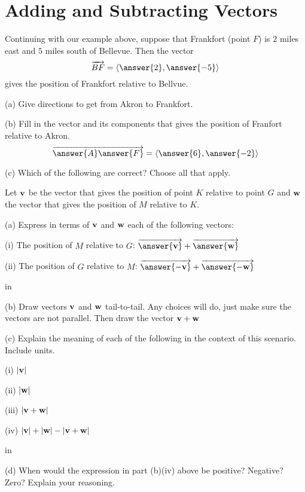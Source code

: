 \documentclass{ximera}
\newcommand{\pskip}{\vskip 0.1 in}
\begin{document}
\section{Adding and Subtracting Vectors}

\begin{question}    \label{Q234234:Vectors}
Continuing with our example above, suppose that Frankfort (point $F$) is $2$ miles east and $5$ miles south of Bellevue. Then the vector
\[
    \overrightarrow{BF}  = \langle \answer{2}, \answer{-5}\rangle
\]
gives the position of Frankfort relative to Bellvue. 
\end{question}

\begin{question} \label{Q233:Vectors}
(a) Give directions to get from Akron to Frankfort.

(b) Fill in the vector and its components that gives the position of Franfort relative to Akron.
\[
       \overrightarrow{\answer{A} \answer{F}}    =  \langle  \answer{6} , \answer{-2}  \rangle 
\]

(c) Which of the following are correct? Choose all that apply.
\begin{selectAll}  
\end{selectAll} 


\end{question}


\begin{question}  \label{Q543:Vectors}
Let ${\bf v}$ be the vector that gives the position of point $K$ relative to point $G$ and ${\bf w}$ the vector that gives the position of $M$ relative to $K$. 

(a) Express in terms of ${\bf v}$ and ${\bf w}$ each of the following vectors: 

(i) The position of $M$ relative to $G$:  $\overrightarrow{\bf \answer{v}} +  \overrightarrow{\bf \answer{w}} $

(ii) The position of $G$ relative to $M$:  $\overrightarrow{\bf \answer{-v}} +  \overrightarrow{\bf \answer{-w}} $

\pskip

(b) Draw vectors ${\bf v}$ and ${\bf w}$ tail-to-tail. Any choices will do, just make sure the vectors are not parallel. Then draw the vector ${\bf v} + {\bf w}$

(c) Explain the meaning of each of the following in the context of this scenario. Include units. 

(i) $|  {\bf v} |$

(ii) $|  {\bf w} |$

(iii) $|  {\bf v+w} |$

(iv) $|  {\bf v} | + |  {\bf w} | - |  {\bf v+w} |$

\pskip

(d) When would the expression in part (b)(iv) above be positive? Negative? Zero? Explain your reasoning. 

\end{question}
\end{document}
